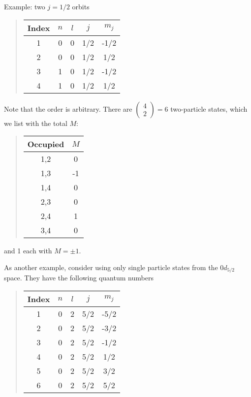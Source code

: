 \documentclass[%
twoside,                 %
final,                   %
10pt]{article}
\begin{document}
Example: two $j=1/2$ orbits


\begin{quote}
\begin{tabular}{ccccc}
\hline
\multicolumn{1}{c}{ Index } & \multicolumn{1}{c}{ $n$ } & \multicolumn{1}{c}{ $l$ } & \multicolumn{1}{c}{ $j$ } & \multicolumn{1}{c}{ $m_j$ } \\
\hline
1     & 0   & 0   & 1/2 & -1/2  \\
2     & 0   & 0   & 1/2 & 1/2   \\
3     & 1   & 0   & 1/2 & -1/2  \\
4     & 1   & 0   & 1/2 & 1/2   \\
\hline
\end{tabular}
\end{quote}

\noindent
Note that the order is arbitrary.
There are $\left ( \begin{array}{c} 4 \\ 2 \end{array} \right) = 6$ two-particle states, 
which we list with the total $M$:


\begin{quote}
\begin{tabular}{cc}
\hline
\multicolumn{1}{c}{ Occupied } & \multicolumn{1}{c}{ $M$ } \\
\hline
1,2      & 0   \\
1,3      & -1  \\
1,4      & 0   \\
2,3      & 0   \\
2,4      & 1   \\
3,4      & 0   \\
\hline
\end{tabular}
\end{quote}

\noindent
and 1 each with $M = \pm 1$.




As another example, consider using only single particle states from the $0d_{5/2}$ space. 
They have the following quantum numbers


\begin{quote}
\begin{tabular}{ccccc}
\hline
\multicolumn{1}{c}{ Index } & \multicolumn{1}{c}{ $n$ } & \multicolumn{1}{c}{ $l$ } & \multicolumn{1}{c}{ $j$ } & \multicolumn{1}{c}{ $m_j$ } \\
\hline
1     & 0   & 2   & 5/2 & -5/2  \\
2     & 0   & 2   & 5/2 & -3/2  \\
3     & 0   & 2   & 5/2 & -1/2  \\
4     & 0   & 2   & 5/2 & 1/2   \\
5     & 0   & 2   & 5/2 & 3/2   \\
6     & 0   & 2   & 5/2 & 5/2   \\
\hline
\end{tabular}
\end{quote}
\end{document}
